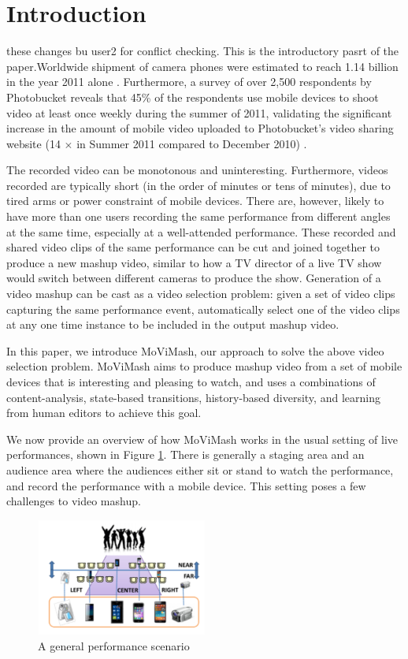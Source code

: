 \documentclass{sig-alternate}
\begin{document}
\section{Introduction}
these changes bu user2 for conflict checking.
This is the introductory pasrt of the paper.Worldwide shipment of camera phones were estimated to reach
1.14 billion in the year 2011 alone \cite{1}. Furthermore, a survey of over 2,500 respondents by Photobucket reveals that 45\% of the respondents use mobile devices to shoot video at least once weekly during the summer of 2011, validating the significant increase in the amount of mobile video uploaded to Photobucket's video sharing website (14 $\times$ in Summer 2011 compared to December 2010) \cite{2}.


The recorded video can be monotonous and uninteresting. Furthermore, videos recorded are typically short (in the order of minutes or tens of minutes), due to tired arms or power constraint of mobile devices. There are, however, likely to have more than one users
recording the same performance from different angles at the same
time, especially at a well-attended performance.
These recorded and shared video clips of the same performance
can be cut and joined together to produce a new mashup video, similar to how a TV director of a live TV show would switch between different cameras to produce the show. Generation of a video mashup can be cast as a video selection problem: given a set of video clips capturing the same performance event, automatically select one of the video clips at any one time instance to be included in the output mashup video.

In this paper, we introduce MoViMash, our approach to solve
the above video selection problem. MoViMash aims to produce
mashup video from a set of mobile devices that is interesting and
pleasing to watch, and uses a combinations of content-analysis,
state-based transitions, history-based diversity, and learning from
human editors to achieve this goal.

We now provide an overview of how MoViMash works in the
usual setting of live performances, shown in Figure \ref{fig:fig1}. There is
generally a staging area and an audience area where the audiences either sit or stand to watch the performance, and record the performance with a mobile device. This setting poses a few challenges to video mashup.

\begin{figure}[h]
    \centering
    \includegraphics[width=0.5\textwidth]{img1.png}
    \caption{A general performance scenario}
    \label{fig:fig1}
\end{figure}
\end{document}
